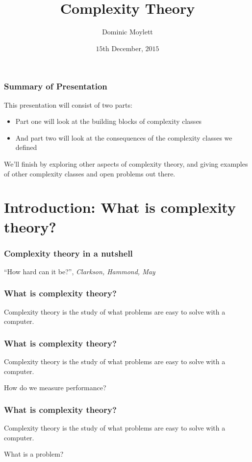\documentclass[aspectratio=169]{beamer}
\title[Complexity theory]{Complexity Theory} %
\author{Dominic Moylett} %
\institute[University of Bristol] %
{
Quantum Engineering CDT\\
University of Bristol \\ %
\medskip
\textit{\href{mailto:dominic.moylett@bristol.ac.uk}{dominic.moylett@bristol.ac.uk}} %
}
\date{$15$th December, $2015$} %
\begin{document}
\begin{frame}
\titlepage %
\end{frame}


\begin{frame}
\frametitle{Summary of Presentation}
This presentation will consist of two parts:
\begin{itemize}
    \item Part one will look at the building blocks of complexity classes
    \item And part two will look at the consequences of the complexity classes we defined
\end{itemize}

We'll finish by exploring other aspects of complexity theory, and giving examples of other complexity classes and open problems out there.
\end{frame}

\section{Introduction: What is complexity theory?}

\begin{frame}
\frametitle{Complexity theory in a nutshell}
\centerline{``How hard can it be?'', {\em Clarkson, Hammond, May}}
\end{frame}

\begin{frame}
\frametitle{What is complexity theory?}
Complexity theory is the study of what problems are easy to solve with a computer.
\end{frame}

\begin{frame}
\frametitle{What is complexity theory?}
Complexity theory is the study of what problems are {\color{red} easy} to solve with a computer.

How do we measure performance?
\end{frame}

\begin{frame}
\frametitle{What is complexity theory?}
Complexity theory is the study of what {\color{red} problems} are easy to solve with a computer.

What is a problem?
\end{frame}
\end{document}
